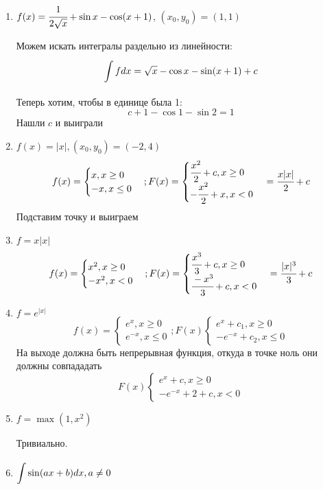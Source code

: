 \begin{enumerate}
    \item $f(x) = \cfrac{1}{2\sqrt{x}}+\sin x - \cos (x+1)$, $(x_0,y_0)=(1,1)$

    Можем искать интегралы раздельно из линейности:
    $$\displaystyle\int\limits_{}^{} f dx = \sqrt{x}-\cos x -  \sin(x+1)+c$$
    Теперь хотим, чтобы в единице была 1: 
    $$c + 1 - \cos 1 - \sin 2 = 1$$
    Нашли $c$ и выиграли
    
    \item $f(x) = |x|, (x_0,y_0)=(-2,4)$
    $$f(x) = \begin{cases}
        x, x\geq0\\
        -x,x\leq 0
    \end{cases}; F(x) = \begin{cases}
        \cfrac{x^2}{2}+c, x \geq 0 \\
        -\cfrac{x^2}{2}+x,x<0
    \end{cases} = \cfrac{x|x|}{2}+c$$
    Подставим точку и выиграем
    \item $f = x|x|$
    $$f(x)=\begin{cases}
        x^2,x\geq 0 \\
        -x^2, x <0
    \end{cases}; F(x) = \begin{cases}
        \cfrac{x^3}{3}+c, x \geq 0 \\
        \cfrac{-x^3}{3}+c, x <0
    \end{cases} = \cfrac{|x|^3}{3}+c$$
    \item $f = e^{|x|}$
    $$f(x) = \begin{cases}
        e^x, x\geq 0 \\
        e^{-x}, x\leq 0
    \end{cases}; F(x)  \begin{cases}
        e^x + c_1, x\geq 0 \\
        -e^{-x}+c_2, x\leq 0
    \end{cases}$$
    На выходе должна быть непрерывная функция, откуда в точке ноль они должны совпададать
    $$F(x) \begin{cases}
        e^x + c, x \geq 0 \\
        -e^{-x}+2+c,x<0
    \end{cases}$$
    \item $f = \max(1,x^2)$

    Тривиально.
    \item $\displaystyle\int\limits_{}^{}\sin(ax+b)dx , a\neq 0 $


\end{enumerate}
